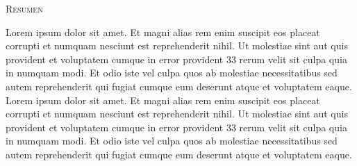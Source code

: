 \raggedright{\scshape\Huge Resumen \par}
\justify
    Lorem ipsum dolor sit amet. Et magni alias rem enim suscipit eos placeat corrupti et numquam nesciunt est reprehenderit nihil. Ut molestiae sint aut quis provident et voluptatem cumque in error provident 33 rerum velit sit culpa quia in numquam modi. Et odio iste vel culpa quos ab molestiae necessitatibus sed autem reprehenderit qui fugiat cumque eum deserunt atque et voluptatem eaque.
    \newline
    Lorem ipsum dolor sit amet. Et magni alias rem enim suscipit eos placeat corrupti et numquam nesciunt est reprehenderit nihil. Ut molestiae sint aut quis provident et voluptatem cumque in error provident 33 rerum velit sit culpa quia in numquam modi. Et odio iste vel culpa quos ab molestiae necessitatibus sed autem reprehenderit qui fugiat cumque eum deserunt atque et voluptatem eaque.
